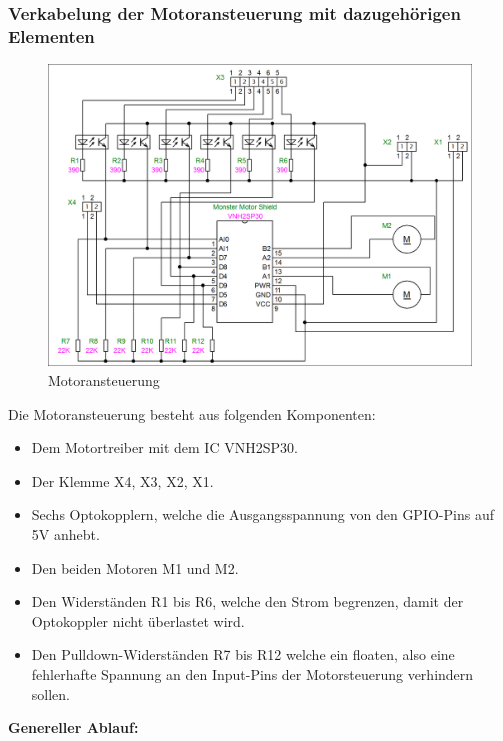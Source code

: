 \subsubsection{Verkabelung der Motoransteuerung mit dazugehörigen Elementen}
\begin{figure}[H] 

\begin{center}

\includegraphics[width=15cm]{Bilder/Schaltplan/Motoransteuerung}
\caption{Motoransteuerung}
\label{Motoransteuerung}
\end{center}
\end{figure}
Die Motoransteuerung besteht aus folgenden Komponenten:\\
\begin{itemize}
\item Dem Motortreiber mit dem IC VNH2SP30.
\item Der Klemme X4, X3, X2, X1.
\item Sechs Optokopplern, welche die Ausgangsspannung von den GPIO-Pins auf 5V anhebt.
\item Den beiden Motoren M1 und M2.
\item Den Widerständen R1 bis R6, welche den Strom begrenzen, damit der Optokoppler nicht überlastet wird.
\item Den Pulldown-Widerständen R7 bis R12 welche ein floaten, also eine fehlerhafte Spannung an den Input-Pins der Motorsteuerung verhindern sollen. \\
\end{itemize}
\newpage
\textbf{Genereller Ablauf:}
